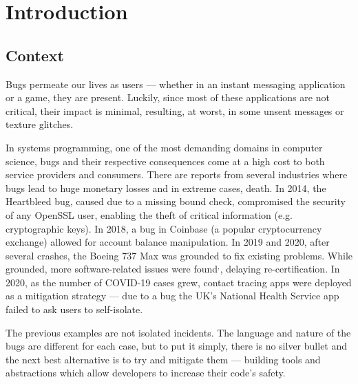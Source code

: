 
\chapter{Introduction}\label{cha:introduction}

\section{Context}\label{sec:context}

Bugs permeate our lives as users --- whether in an instant messaging application or a game, they are present.
Luckily, since most of these applications are not critical, their impact is minimal,
resulting, at worst, in some unsent messages or texture glitches.

In systems programming, one of the most demanding domains in computer science,
bugs and their respective consequences come at a high cost to both service providers and consumers.
There are reports from several industries where bugs lead to huge monetary losses and in extreme cases, death.
In 2014, the Heartbleed bug, caused due to a missing bound check,
compromised the security of any OpenSSL user, enabling the theft of critical information (e.g. cryptographic keys).
In 2018, a bug in Coinbase (a popular cryptocurrency exchange)
allowed for account balance manipulation.
In 2019 and 2020, after several crashes,
the Boeing 737 Max was grounded to fix existing problems.
While grounded, more software-related issues were found$^,$, delaying re-certification.
In 2020, as the number of COVID-19 cases grew,
contact tracing apps were deployed as a mitigation strategy ---
due to a bug the UK's National Health Service app failed to ask users to self-isolate.

The previous examples are not isolated incidents.
The language and nature of the bugs are different for each case, but to put it simply,
there is no silver bullet and the next best alternative is to try and mitigate them ---
building tools and abstractions which allow developers to increase their code's safety.

